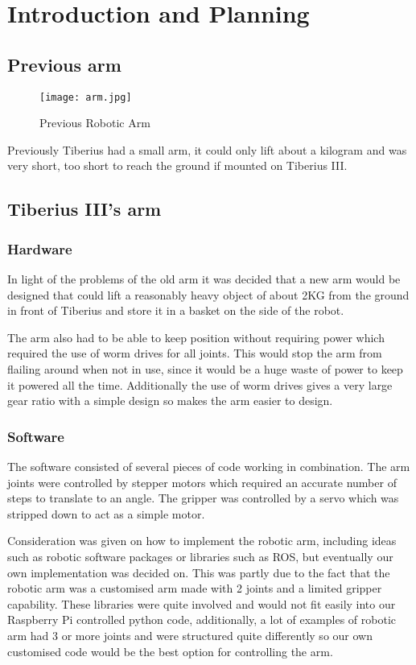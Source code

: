 \section{Introduction and Planning}
\subsection{Previous arm}

\begin{figure}[!htb]
\begin{center}
\texttt{[image: arm.jpg]}
\end{center}
\caption{Previous Robotic Arm}
\label{fig:arm}
\end{figure}

Previously Tiberius had a small arm, it could only lift about a kilogram and was very short, too short to reach the ground if mounted on Tiberius III.  
\subsection{Tiberius III's arm}
\subsubsection{Hardware}
In light of the problems of the old arm it was decided that a new arm would be designed that could lift a reasonably heavy object of about 2KG from the ground in front of Tiberius and store it in a basket on the side of the robot.

The arm also had to be able to keep position without requiring power which required the use of worm drives for all joints. This would stop the arm from flailing around when not in use, since it would be a huge waste of power to keep it powered all the time. Additionally the use of worm drives gives a very large gear ratio with a simple design so makes the arm easier to design.

\subsubsection{Software}
The software consisted of several pieces of code working in combination.  The arm joints were controlled by stepper motors which required an accurate number of steps to translate to an angle.
The gripper was controlled by a servo which was stripped down to act as a simple motor.  

Consideration was given on how to implement the robotic arm, including ideas such as robotic software packages or libraries such as ROS, but eventually our own implementation was decided on.  This was partly due to the fact that the robotic arm was a customised arm made with 2 joints and a limited gripper capability.  These libraries were quite involved and would not fit easily into our Raspberry Pi controlled python code, additionally, a lot of examples of robotic arm had 3 or more joints and were structured quite differently so our own customised code would be the best option for controlling the arm.


